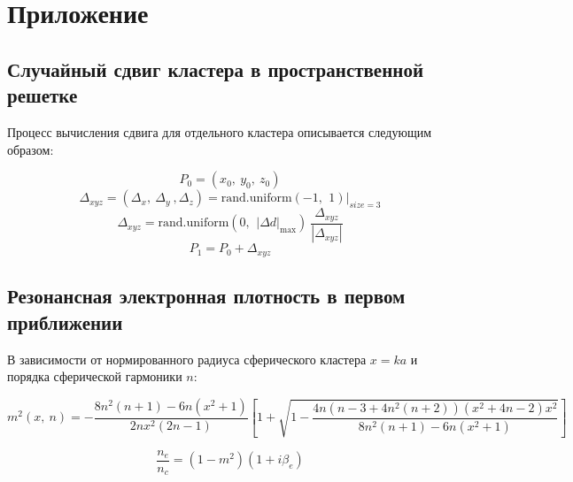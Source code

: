 \newpage
\section*{Приложение}
\subsection*{Случайный сдвиг кластера в пространственной решетке}

Процесс вычисления сдвига для отдельного кластера описывается следующим образом:

    \begin{equation}
        P_0 = (x_0,\:y_0,\:z_0)
        \label{random_shifts}
    \end{equation}
    \begin{equation*}
        \Delta_{xyz} = (\Delta_x,\: \Delta_y\:, \Delta_z) = \textrm{rand.uniform}\left( -1,\:\,1 \right)|_{size=3}
    \end{equation*}
    \begin{equation*}
        \Delta_{xyz} = \textrm{rand.uniform}\left(0,\:\,|\Delta d|_{\max} \right)\:\frac{\Delta_{xyz}}{|\Delta_{xyz}|}
    \end{equation*}
    \begin{equation*}
        P_1 = P_0 + \Delta_{xyz}
    \end{equation*}

\subsection*{Резонансная электронная плотность в первом приближении}

В зависимости от нормированного радиуса сферического кластера $x = ka$ и порядка сферической гармоники $n$:

\begin{equation}
    m^2 \left(x,\:n \right) = -\frac{8n^2 (n + 1)-6n (x^2 + 1)}{2n x^2 (2n-1)} \left[ 1 + \sqrt{ 1 -\frac{4n (n-3 + 4n^2 (n + 2)) (x^2 + 4n-2) x^2}{8n^2 (n + 1) -6n (x^2 + 1)} } \right]
    \label{m2_resonance}
\end{equation}

\begin{equation}
    \frac{n_e}{n_c} = (1 - m^2) (1 + i \beta_e)
    \label{nenc_resonance}
\end{equation}